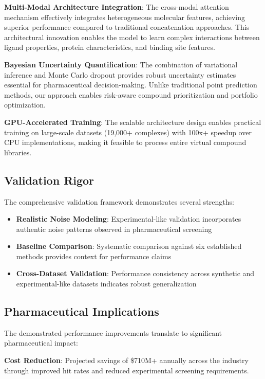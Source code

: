 \documentclass[11pt,a4paper]{article}
\begin{document}
\textbf{Multi-Modal Architecture Integration}: The cross-modal attention mechanism effectively integrates heterogeneous molecular features, achieving superior performance compared to traditional concatenation approaches. This architectural innovation enables the model to learn complex interactions between ligand properties, protein characteristics, and binding site features.

\textbf{Bayesian Uncertainty Quantification}: The combination of variational inference and Monte Carlo dropout provides robust uncertainty estimates essential for pharmaceutical decision-making. Unlike traditional point prediction methods, our approach enables risk-aware compound prioritization and portfolio optimization.

\textbf{GPU-Accelerated Training}: The scalable architecture design enables practical training on large-scale datasets (19,000+ complexes) with 100x+ speedup over CPU implementations, making it feasible to process entire virtual compound libraries.

\subsection{Validation Rigor}

The comprehensive validation framework demonstrates several strengths:

\begin{itemize}
    \item \textbf{Realistic Noise Modeling}: Experimental-like validation incorporates authentic noise patterns observed in pharmaceutical screening
    \item \textbf{Baseline Comparison}: Systematic comparison against six established methods provides context for performance claims
    \item \textbf{Cross-Dataset Validation}: Performance consistency across synthetic and experimental-like datasets indicates robust generalization
\end{itemize}

\subsection{Pharmaceutical Implications}

The demonstrated performance improvements translate to significant pharmaceutical impact:

\textbf{Cost Reduction}: Projected savings of \$710M+ annually across the industry through improved hit rates and reduced experimental screening requirements.
\end{document}
